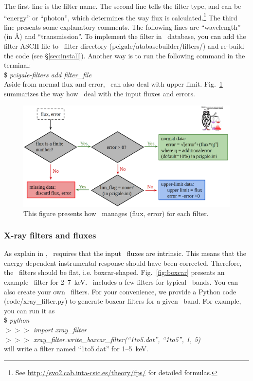 The first line is the filter name. 
The second line tells the filter type, and can be ``energy'' or ``photon'', which determines the way flux is calculated.\footnote{See \url{http://svo2.cab.inta-csic.es/theory/fps/} for detailed formulas.}
The third line presents some explanatory comments. 
The following lines are ``wavelength'' (in \r{A}) and ``transmission''. 
To implement the filter in \xcig\ database, you can add the filter ASCII file to \xcig\ filter directory (pcigale/atabasebuilder/filters/) and re-build the code (see \S\ref{sec:install}). 
Another way is to run the following command in the terminal: \\
\$ \textit{pcigale-filters add filter\_file} \\

Aside from normal flux and error, \xcig\ can also deal with upper limit. 
Fig.~\ref{fig:flux_fluxerr} summarizes the way how \xcig\ deal with the input fluxes and errors.

\begin{figure}[ht]
\includegraphics[width=\columnwidth]{pdfanalysis/flux_fluxerr.png}
\caption[How \xcig\ manages fluxes and flux errors]{This figure presents how \xcig\ manages (flux, error) for each filter.}
\label{fig:flux_fluxerr}
\end{figure}

\subsubsection{X-ray filters and fluxes}\label{sec:xray}
As explain in \cite{yang20}, \xcig\ requires that the input \xray\ fluxes are intrinsic.
This means that the energy-dependent instrumental response should have been corrected. 
Therefore, the \xray\ filters should be flat, i.e. boxcar-shaped. 
Fig.~\ref{fig:boxcar} presents an example \xray\ filter for 2--7~keV. 
\xcig\ includes a few filters for typical \xray\ bands. 
You can also create your own \xray\ filters. 
For your convenience, we provide a Python code (code/xray\_filter.py) to generate boxcar filters for a given \xray\ band. 
For example, you can run it as \\
\$ \textit{python} \\
$>>>$ \textit{import xray\_filter} \\
$>>>$ \textit{xray\_filter.write\_boxcar\_filter(``1to5.dat'', ``1to5'', 1, 5)} \\
will write a filter named ``1to5.dat'' for 1--5~keV. 

